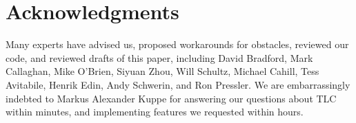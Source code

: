 \documentclass{vldb}
\begin{document}

\balance
\section{Acknowledgments}
\label{sec:acknowledgments}
Many experts have advised us, proposed workarounds for obstacles, reviewed our code, and reviewed drafts of this paper, including 
David Bradford,
Mark Callaghan,
Mike O'Brien,
Siyuan Zhou,
Will Schultz,
Michael Cahill,
Tess Avitabile,
Henrik Edin,
Andy Schwerin,
and Ron Pressler.
We are embarrassingly indebted to Markus Alexander Kuppe for answering our questions about TLC within minutes, and implementing features we requested within hours.


\end{document}
